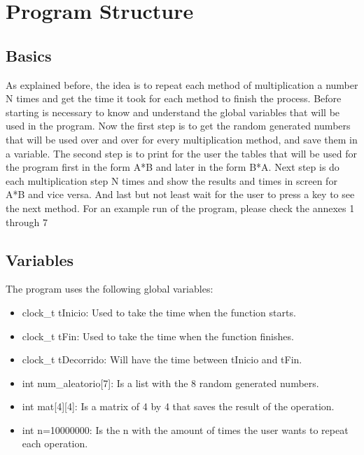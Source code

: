 \documentclass[legalpaper,12pt]{article}
\begin{document}
\newpage



\section{Program Structure}

\subsection{Basics}
\justifying
As explained before, the idea is to repeat each method of multiplication a number N times and get the time it took for each method to finish the process. Before starting is necessary to know and understand the global variables that will be used in the program. Now the first step is to get the random generated numbers that will be used over and over for every multiplication method, and save them in a variable. The second step is to print for the user the tables that will be used for the program first in the form A*B and later in the form B*A. Next step is do each multiplication step N times and show the results and times in screen for A*B and vice versa. And last but not least wait for the user to press a key to see the next method. For an example run of the program, please check the annexes 1 through 7\\ [0.5cm]

\subsection{Variables}
The program uses the following global variables:
\begin{itemize}
    \item clock\_t tInicio: Used to take the time when the function starts.
    \item clock\_t tFin: Used to take the time when the function finishes.
    \item clock\_t tDecorrido: Will have the time between tInicio and tFin.
    \item int num\_aleatorio[7]: Is a list with the 8 random generated numbers.
    \item int mat[4][4]: Is a matrix of 4 by 4 that saves the result of the operation.
    \item int n=10000000: Is the n with the amount of times the user wants to repeat each operation.
\end{itemize}
\end{document}
